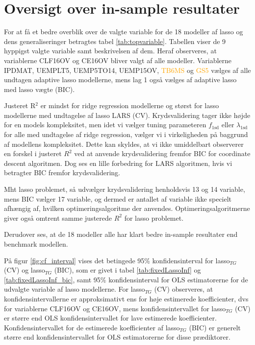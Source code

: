 \section{Oversigt over in-sample resultater} 
For at få et bedre overblik over de valgte variable for de 18 modeller af lasso og dens generaliseringer betragtes tabel \ref{tab:topvariable}.
Tabellen viser de 9 hyppigst valgte variable samt beskrivelsen af dem. 
Heraf observeres, at variablerne \textcolor{blue3}{CLF16OV} og \textcolor{blue3}{CE16OV} bliver valgt af alle modeller.
Variablerne \textcolor{chartreuse4}{IPDMAT}, \textcolor{blue3}{UEMPLT5}, \textcolor{blue3}{UEMP5TO14}, \textcolor{blue3}{UEMP15OV}, \textcolor{orange}{TB6MS} og \textcolor{orange}{GS5} vælges af alle undtagen adaptive lasso modellerne, mens \textcolor{blue3}{lag 1} også vælges af adaptive lasso med lasso vægte (BIC).



Justeret R$^2$ er mindst for ridge regression modellerne og størst for lasso modellerne med undtagelse af lasso LARS (CV).
Krydsvalidering tager ikke højde for en models kompleksitet, men idet vi vælger tuning parameteren \(f_\text{1sd}\) eller \(\lambda_\text{1sd}\) for alle med undtagelse af ridge regression, vælger vi i virkeligheden på baggrund af modellens kompleksitet.
Dette kan skyldes, at vi ikke umiddelbart observerer en forskel i justeret \(R^2\) ved at anvende krydsvalidering fremfor BIC for coordinate descent algoritmen.
Dog ses en lille forbedring for LARS algoritmen, hvis vi betragter BIC fremfor krydsvalidering.

Mht lasso problemet, så udvælger krydsvalidering henholdsvis 13 og 14 variable, mens BIC vælger 17 variable, og dermed er antallet af variable ikke specielt afhængig af, hvilken optimeringsalgoritme der anvendes.
Optimeringsalgoritmerne giver også omtrent samme justerede \(R^2\) for lasso problemet.

Derudover ses, at de 18 modeller alle har klart bedre in-sample resultater end benchmark modellen. 

På figur \ref{fig:cf_interval} vises det betingede 95\% konfidensinterval for lasso\(_{TG}\) (CV) og lasso\(_{TG}\) (BIC), som er givet i tabel \ref{tab:fixedLassoInf} og \ref{tab:fixedLassoInf_bic}, samt 95\% konfidensinterval for OLS estimatorerne for de udvalgte variable af lasso modellerne. 
For lasso\(_{TG}\) (CV) observeres, at konfidensintervallerne er approksimativt ens for høje estimerede koefficienter, dvs for variablerne \textcolor{blue3}{CLF16OV} og \textcolor{blue3}{CE16OV}, mens  konfidensintervallet for lasso\(_{TG}\) (CV) er større end OLS konfidensintervallet for lave estimerede koefficienter.
Konfidensintervallet for de estimerede koefficienter af lasso\(_{TG}\) (BIC) er generelt større end konfidensintervallet for OLS estimatorerne for disse prædiktorer.

